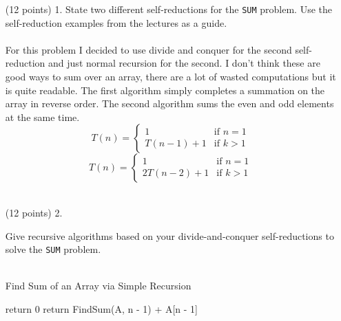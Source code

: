 \documentclass[paper=a4,fontsize=11pt]{article}
\begin{document}
\begin{enumerate}
\item [(12 points) 1.] State two different self-reductions for the \texttt{SUM} problem. Use the self-reduction examples from the lectures as a guide.\\
\\For this problem I decided to use divide and conquer for the second self-reduction and just normal recursion for the second. I don't think these are good ways to sum over an array, there are a lot of wasted computations but it is quite readable. The first algorithm simply completes a summation on the array in reverse order. The second algorithm sums the even and odd elements at the same time.{
\[
  T(n) =
    \begin{cases}
        1 & \text{if $n = 1$} \\
        T(n - 1) + 1 & \text{if $k > 1$}
    \end{cases}
\]
\[
  T(n) =
    \begin{cases}
        1 & \text{if $n = 1$} \\
        2T(n-2) + 1 & \text{if $k > 1$}
    \end{cases}
\]
}
\\\item [(12 points) 2.]{ Give recursive algorithms based on your divide-and-conquer self-reductions to solve the \texttt{SUM} problem.\\\\
\begin{algorithm}
\caption{Find Sum of an Array via Simple Recursion}
\label{array-sum}
\begin{algorithmic}[1]
        \State return 0
    \Else
        \State return FindSum(A, n - 1) + A[n - 1]
    \EndIf
\EndProcedure
\end{algorithmic}
\end{algorithm}

}
\end{enumerate}
\end{document}
